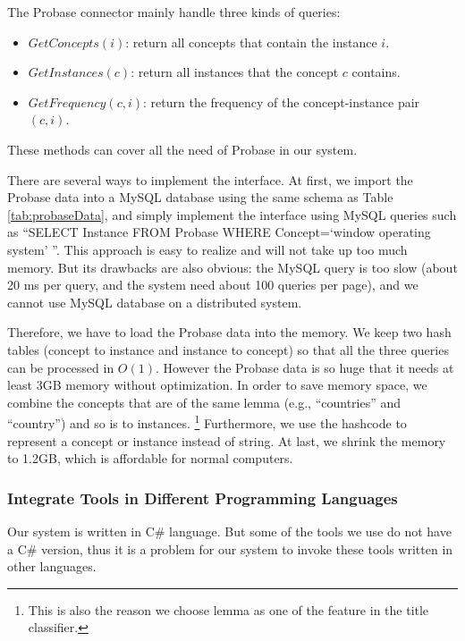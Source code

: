 The Probase connector mainly handle three kinds of queries:

\begin{itemize}
\item \textbf{ $GetConcepts(i)$}:
return all concepts that contain the instance $i$.

\item \textbf{ $GetInstances(c)$}:
return all instances that the concept $c$ contains.

\item \textbf{ $GetFrequency(c,i)$}:
return the frequency of the concept-instance pair $(c,i)$.

\end{itemize}

These methods can cover all the need of Probase in our system.

There are several ways to implement the interface. At first, we import the Probase data into a MySQL database\cite{mysqlWebsite} using the same schema as Table \ref{tab:probaseData},
and simply implement the interface using MySQL queries such as ``SELECT Instance FROM Probase WHERE Concept=`window operating system' ''. This approach is easy to realize and will not take up too much memory. But its drawbacks are also obvious: the MySQL query is too slow (about 20 ms per query, and the system need about 100 queries per page), and we cannot use MySQL database on a distributed system.

Therefore, we have to load the Probase data into the memory. We keep two hash tables (concept to instance and instance to concept) so that all the three queries can be processed in $O(1)$. However the Probase data is so huge that it needs at least 3GB memory without optimization.
In order to save memory space, we combine the concepts that are of the same lemma (e.g., ``countries'' and ``country'') and so is to instances. \footnote{This is also the reason we choose lemma as one of the feature in the title classifier.}
Furthermore, we use the hashcode to represent a concept or instance instead of string. At last, we shrink the memory to 1.2GB, which is affordable for normal computers.

\subsubsection{Integrate Tools in Different Programming Languages}
Our system is written in C\# language. But some of the tools we use do not have a C\# version, thus it is a problem for our system to invoke these tools written in other languages.

